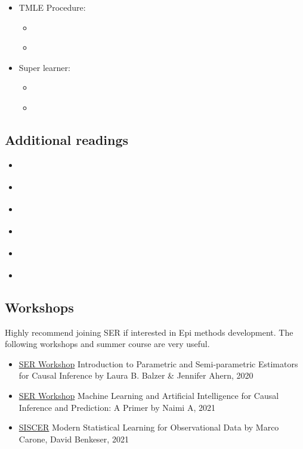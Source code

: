 \documentclass[
]{book}
\providecommand{\tightlist}{%
  \setlength{\itemsep}{0pt}\setlength{\parskip}{0pt}}
\begin{document}
\begin{itemize}
\tightlist
\item
  TMLE Procedure:

  \begin{itemize}
  \tightlist
  \item
    \citet{luque2018targeted}
  \item
    \citet{schuler2017targeted}
  \end{itemize}
\item
  Super learner:

  \begin{itemize}
  \tightlist
  \item
    \citet{rose2013mortality}
  \item
    \citet{naimi2018stacked}
  \end{itemize}
\end{itemize}

\hypertarget{additional-readings}{%
\subsection{Additional readings}\label{additional-readings}}

\begin{itemize}
\tightlist
\item
  \citet{rose2020intersections}
\item
  \citet{snowden2011implementation}
\item
  \citet{naimi2017introduction}
\item
  \citet{austin2015moving}
\item
  \citet{naimi2017challenges}
\item
  \citet{balzer2021demystifying}
\end{itemize}

\hypertarget{workshops}{%
\subsection{Workshops}\label{workshops}}

Highly recommend joining SER if interested in Epi methods development. The following workshops and summer course are very useful.

\begin{itemize}
\tightlist
\item
  \href{https://epiresearch.org/}{SER Workshop} Introduction to Parametric and Semi-parametric Estimators for Causal Inference by Laura B. Balzer \& Jennifer Ahern, 2020
\item
  \href{https://epiresearch.org/}{SER Workshop} Machine Learning and Artificial Intelligence for Causal Inference and Prediction: A Primer by Naimi A, 2021
\item
  \href{https://si.biostat.washington.edu/suminst/archives/SISCER2021/CR2106}{SISCER} Modern Statistical Learning for Observational Data by Marco Carone, David Benkeser, 2021
\end{itemize}
\end{document}
